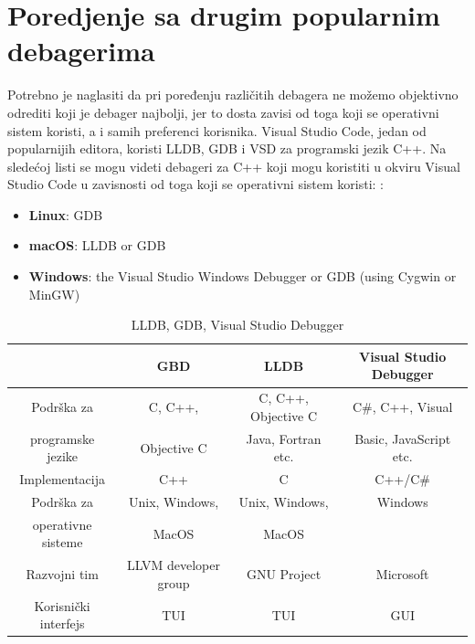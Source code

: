 \documentclass[a4paper]{article}
\begin{document}
\section{Poredjenje sa drugim popularnim debagerima}
\label{sec:naslovN}

Potrebno je naglasiti da pri poređenju različitih debagera ne možemo objektivno odrediti koji je debager najbolji, jer to dosta zavisi od toga koji se operativni sistem koristi, a i samih preferenci korisnika. Visual Studio Code, jedan od popularnijih editora, koristi LLDB, GDB i VSD za programski jezik C++. Na sledećoj listi se mogu videti debageri za C++ koji mogu koristiti u okviru Visual Studio Code u zavisnosti od toga koji se operativni sistem koristi: \cite{vsc_support}:
\begin{itemize}
	\item \textbf{Linux}: GDB
	\item \textbf{macOS}: LLDB or GDB
	\item \textbf{Windows}: the Visual Studio Windows Debugger or GDB (using Cygwin or MinGW)
\end{itemize}

\begin{table}[ht!]
	\begin{center}
		\caption{LLDB, GDB, Visual Studio Debugger \cite{gdb}\cite{lldb}\cite{vsd}}
		\label{table:tabela_poredjenje}
		\begin{footnotesize}
			\begin{tabular}{| c | c | c | c |}
				\hline
				& \cellcolor{red!60}GBD & \cellcolor{red!60}LLDB & \cellcolor{red!60}Visual Studio Debugger \\ 
				\hline
				\cellcolor{orange!60}Podrška za& \cellcolor{yellow!60}C, C++, & \cellcolor{yellow!60}C, C++, Objective C & \cellcolor{yellow!60}C\#, C++, Visual \\ 
				\cellcolor{orange!60}programske jezike & \cellcolor{yellow!60}Objective C & \cellcolor{yellow!60}Java, Fortran etc. & \cellcolor{yellow!60}Basic, JavaScript etc. \\ 
				\hline 
				\cellcolor{orange!60}Implementacija & \cellcolor{yellow!60}C++ & \cellcolor{yellow!60}C & \cellcolor{yellow!60}C++/C\# \\
				\hline
				\cellcolor{orange!60}Podrška za& \cellcolor{yellow!60}Unix, Windows,& \cellcolor{yellow!60}Unix, Windows,& \cellcolor{yellow!60}Windows\\
				\cellcolor{orange!60}operativne sisteme & \cellcolor{yellow!60}MacOS & \cellcolor{yellow!60}MacOS & \cellcolor{yellow!60}\\
				\hline
				\cellcolor{orange!60}Razvojni tim & \cellcolor{yellow!60}LLVM developer group & \cellcolor{yellow!60}GNU Project & \cellcolor{yellow!60}Microsoft \\
				\hline
				\cellcolor{orange!60}Korisnički interfejs & \cellcolor{yellow!60}TUI & \cellcolor{yellow!60}TUI & \cellcolor{yellow!60}GUI\\
				\hline
			\end{tabular}
		\end{footnotesize}
	\end{center}
\end{table}
\end{document}
